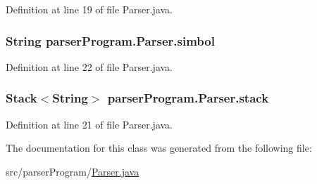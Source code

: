 Definition at line 19 of file Parser.\-java.

\hypertarget{classparser_program_1_1_parser_a2916c5513beafc9ff7ae88ec269bfe76}{
\subsubsection[{simbol}]{\setlength{\rightskip}{0pt plus 5cm}String {\bf parser\-Program.\-Parser.\-simbol}}}\label{classparser_program_1_1_parser_a2916c5513beafc9ff7ae88ec269bfe76}


Definition at line 22 of file Parser.\-java.

\hypertarget{classparser_program_1_1_parser_aba60a83700b302e63b4467f15d5039b0}{
\subsubsection[{stack}]{\setlength{\rightskip}{0pt plus 5cm}Stack$<$String$>$ {\bf parser\-Program.\-Parser.\-stack}}}\label{classparser_program_1_1_parser_aba60a83700b302e63b4467f15d5039b0}


Definition at line 21 of file Parser.\-java.



The documentation for this class was generated from the following file\-:\begin{DoxyCompactItemize}
\item 
src/parser\-Program/\hyperlink{_parser_8java}{Parser.\-java}\end{DoxyCompactItemize}
